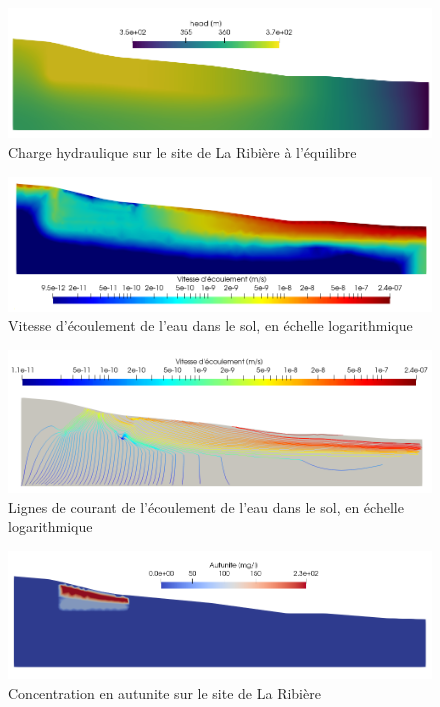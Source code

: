 \documentclass{article}
\begin{document}
\begin{figure}[H]
    \centering
    \includegraphics[width=\linewidth]{LJ-charge-hydraulique-finale.PNG}
    \caption{Charge hydraulique sur le site de La Ribière à l'équilibre}
    \label{fig:charge_hydro_finale}
\end{figure}

\begin{figure}[H]
    \centering
    \includegraphics[width=\linewidth]{LJ-vitesse-ecoulement.PNG}
    \caption{Vitesse d'écoulement de l'eau dans le sol, en échelle logarithmique}
    \label{fig:vitesse_ecoulement}
\end{figure}
\begin{figure}[H]
    \centering
    \includegraphics[width=\linewidth]{LJ-flowrate-lines.PNG}
    \caption{Lignes de courant de l'écoulement de l'eau dans le sol, en échelle logarithmique}
    \label{fig:vitesse_ecoulement_lines}
\end{figure}

\begin{figure}[H]
    \centering
    \includegraphics[width=\linewidth]{LJ-Autunite-concentration.PNG}
    \caption{Concentration en autunite sur le site de La Ribière }
    \label{fig:concentration_autunite}
\end{figure}
\end{document}
